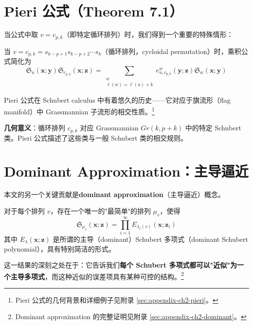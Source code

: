 \section{Pieri 公式（Theorem 7.1）}
\label{sec:PieriFormula}

当公式中取 $v = c_{p,k}$（即特定循环排列）时，我们得到一个重要的特殊情形：

\begin{Theorem}
当 $v = c_{p,k} = s_{k-p+1} s_{k-p+2} \cdots s_k$（循环排列，cycloidal permutation）时，乘积公式简化为
\begin{equation}
\mathfrak{S}_u(\mathbf{x}; \mathbf{y}) \mathfrak{S}_{c_{p,k}}(\mathbf{x}; \mathbf{z}) = \sum_{\substack{w \\ \ell(w) = \ell(u) + k}} e_{u, c_{p,k}}^w(\mathbf{y}; \mathbf{z}) \mathfrak{S}_w(\mathbf{x}; \mathbf{y})
\label{eq:PieriFormula}
\end{equation}
\end{Theorem}

Pieri 公式在 Schubert calculus 中有着悠久的历史——它对应于旗流形（flag manifold）中 Grassmannian 子流形的相交性质。\footnote{Pieri 公式的几何背景和详细例子见附录 \cref{sec:appendix-ch2-pieri}。}

\textbf{几何意义}：循环排列 $c_{p,k}$ 对应 Grassmannian $Gr(k, p+k)$ 中的特定 Schubert 类。Pieri 公式描述了这些类与一般 Schubert 类的相交规则。

\section{Dominant Approximation：主导逼近}
\label{sec:DominantApproximation}

本文的另一个关键贡献是\textbf{dominant approximation}（主导逼近）概念。

对于每个排列 $v$，存在一个唯一的"最简单"的排列 $\mu_v$，使得
\begin{equation}
\mathfrak{S}_{\mu_v}(\mathbf{x}; \mathbf{z}) = \prod_{i=1}^{\infty} E_{\lambda_i(v)}(\mathbf{x}; \mathbf{z}_i)
\label{eq:DominantApproximation}
\end{equation}
其中 $E_{\lambda}(\mathbf{x}; \mathbf{z})$ 是所谓的主导（dominant）Schubert 多项式（dominant Schubert polynomial），具有特别简洁的形式。

这一结果的深刻之处在于：它告诉我们\textbf{每个 Schubert 多项式都可以"近似"为一个主导多项式}，而这种近似的误差项具有某种可控的结构。\footnote{Dominant approximation 的完整证明见附录 \cref{sec:appendix-ch2-dominant}。}

